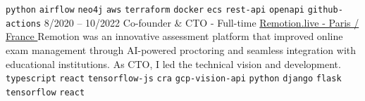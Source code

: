\begin{entrylist}
{        %
        \texttt{python}\slashsep
        \texttt{airflow}\slashsep
        \texttt{neo4j}\slashsep
        \texttt{aws}\slashsep
        \texttt{terraform}\slashsep
        \texttt{docker}\slashsep
        \texttt{ecs}\slashsep
        \texttt{rest-api}\slashsep
        \texttt{openapi}\slashsep
        \texttt{github-actions}\slashsep
    }
    \entry
    {8/2020 -- 10/2022}
    {Co-founder \& CTO - Full-time}
    {\href{https://remotion.live/}{Remotion.live - Paris / France }}
    {Remotion was an innovative assessment platform that improved online exam management through AI-powered proctoring and seamless integration with educational institutions. As CTO, I led the technical vision and development.\\
        \texttt{typescript}\slashsep
        \texttt{react}\slashsep
        \texttt{tensorflow-js}\slashsep
        \texttt{cra}\slashsep
        \texttt{gcp-vision-api}\slashsep
        \texttt{python}\slashsep
        \texttt{django}\slashsep
        \texttt{flask}\slashsep
        \texttt{tensorflow}\slashsep
        \texttt{react}\slashsep
}
\end{entrylist}
